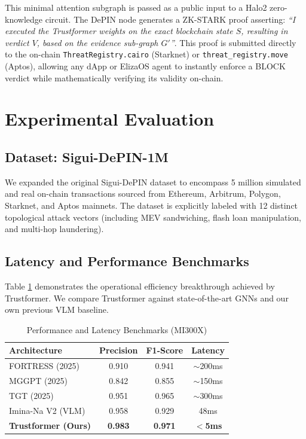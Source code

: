 \documentclass[conference,10pt]{IEEEtran}
\begin{document}
This minimal attention subgraph is passed as a public input to a Halo2 zero-knowledge circuit. The DePIN node generates a ZK-STARK proof asserting: \textit{``I executed the Trustformer weights on the exact blockchain state $S$, resulting in verdict $V$, based on the evidence sub-graph $G'$''}. This proof is submitted directly to the on-chain \texttt{ThreatRegistry.cairo} (Starknet) or \texttt{threat\_registry.move} (Aptos), allowing any dApp or ElizaOS agent to instantly enforce a BLOCK verdict while mathematically verifying its validity on-chain.

\section{Experimental Evaluation}

\subsection{Dataset: Sigui-DePIN-1M}
We expanded the original Sigui-DePIN dataset to encompass 5 million simulated and real on-chain transactions sourced from Ethereum, Arbitrum, Polygon, Starknet, and Aptos mainnets. The dataset is explicitly labeled with 12 distinct topological attack vectors (including MEV sandwiching, flash loan manipulation, and multi-hop laundering). 

\subsection{Latency and Performance Benchmarks}
Table \ref{tab:performance} demonstrates the operational efficiency breakthrough achieved by Trustformer. We compare Trustformer against state-of-the-art GNNs and our own previous VLM baseline.

\begin{table}[htbp]
\caption{Performance and Latency Benchmarks (MI300X)}
\begin{center}
\begin{tabular}{l c c c}
\toprule
\textbf{Architecture} & \textbf{Precision} & \textbf{F1-Score} & \textbf{Latency} \\
\midrule
FORTRESS (2025) \cite{fortress2025} & 0.910 & 0.941 & $\sim$200ms \\
MGGPT (2025) \cite{mggpt2025} & 0.842 & 0.855 & $\sim$150ms \\
TGT (2025) & 0.951 & 0.965 & $\sim$300ms \\
Imina-Na V2 (VLM) & 0.958 & 0.929 & 48ms \\
\textbf{Trustformer (Ours)} & \textbf{0.983} & \textbf{0.971} & \textbf{$<$5ms} \\
\bottomrule
\end{tabular}
\label{tab:performance}
\end{center}
\end{table}
\end{document}
